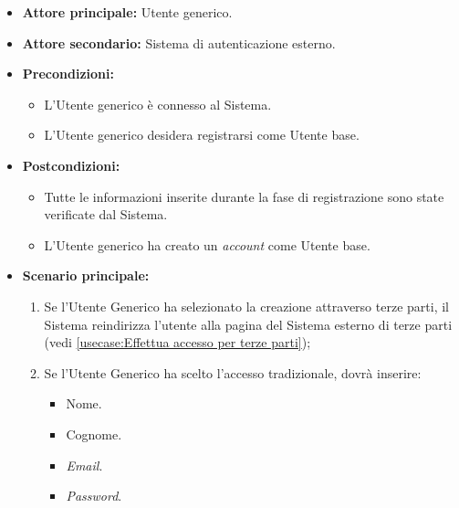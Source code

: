 \label{usecase:Effettua registrazione Utente base}
\begin{itemize}

	\item \textbf{Attore principale:} Utente generico.
	\item \textbf{Attore secondario:} Sistema di autenticazione esterno.

	\item \textbf{Precondizioni:} 
	\begin{itemize}
        \item  L'Utente generico è connesso al Sistema.
        \item  L'Utente generico desidera registrarsi come Utente base.
    \end{itemize}
    
	\item \textbf{Postcondizioni:} 
    \begin{itemize}
        \item  Tutte le informazioni inserite durante la fase di registrazione sono state verificate dal Sistema.
        \item  L'Utente generico ha creato un \textit{account} come Utente base.
    \end{itemize}

	\item \textbf{Scenario principale:}
	\begin{enumerate}

            \item Se l'Utente Generico ha selezionato la creazione attraverso terze parti, il Sistema reindirizza l'utente alla pagina del Sistema esterno di terze parti (vedi \autoref{usecase:Effettua accesso per terze parti});
            \item Se l'Utente Generico ha scelto l'accesso tradizionale, dovrà inserire:
            \begin{itemize}
                \item Nome.
                \item Cognome.
                \item \textit{Email}.
                \item \textit{Password}.
            \end{itemize} 
	\end{enumerate}
\end{itemize}
